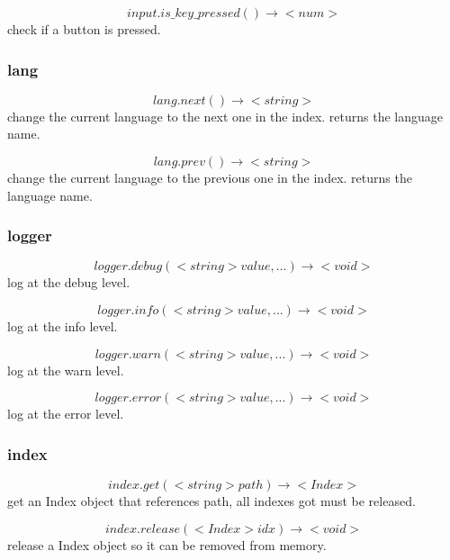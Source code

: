 \documentclass[11pt,fleqn]{book} %
\begin{document}
\begin{equation}
input.is\_key\_pressed() \rightarrow <num>
\end{equation}
check if a button is pressed.

\subsubsection{lang}
\begin{equation}
lang.next() \rightarrow <string>
\end{equation}
change the current language to the next one in the index. returns the language name.

\begin{equation}
lang.prev() \rightarrow <string>
\end{equation}
change the current language to the previous one in the index. returns the language name.

\subsubsection{logger}
\begin{equation}
logger.debug(<string> value, ...) \rightarrow <void>
\end{equation}
log at the debug level.

\begin{equation}
logger.info(<string> value, ...) \rightarrow <void>
\end{equation}
log at the info level.

\begin{equation}
logger.warn(<string> value, ...) \rightarrow <void>
\end{equation}
log at the warn level.

\begin{equation}
logger.error(<string> value, ...) \rightarrow <void>
\end{equation}
log at the error level.

\subsubsection{index}
\begin{equation}
index.get(<string> path) \rightarrow <Index>
\end{equation}
get an Index object that references path, all indexes got must be released.

\begin{equation}
index.release(<Index> idx) \rightarrow <void>
\end{equation}
release a Index object so it can be removed from memory.
\end{document}
